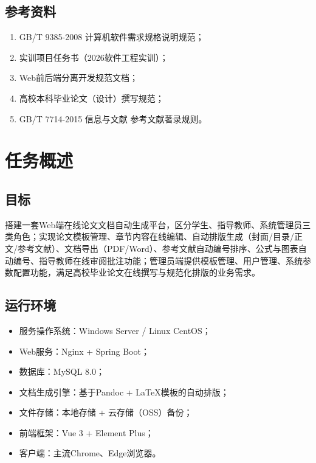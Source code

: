 \documentclass{../template/softeng}
\begin{document}
\subsection{参考资料}
\begin{enumerate}
    \item GB/T 9385-2008 计算机软件需求规格说明规范；
    \item 实训项目任务书（2026软件工程实训）；
    \item Web前后端分离开发规范文档；
    \item 高校本科毕业论文（设计）撰写规范；
    \item GB/T 7714-2015 信息与文献 参考文献著录规则。
\end{enumerate}

\section{任务概述}
\subsection{目标}
搭建一套Web端在线论文文档自动生成平台，区分学生、指导教师、系统管理员三类角色；实现论文模板管理、章节内容在线编辑、自动排版生成（封面/目录/正文/参考文献）、文档导出（PDF/Word）、参考文献自动编号排序、公式与图表自动编号、指导教师在线审阅批注功能；管理员端提供模板管理、用户管理、系统参数配置功能，满足高校毕业论文在线撰写与规范化排版的业务需求。

\subsection{运行环境}
\begin{itemize}
    \item 服务操作系统：Windows Server / Linux CentOS；
    \item Web服务：Nginx + Spring Boot；
    \item 数据库：MySQL 8.0；
    \item 文档生成引擎：基于Pandoc + LaTeX模板的自动排版；
    \item 文件存储：本地存储 + 云存储（OSS）备份；
    \item 前端框架：Vue 3 + Element Plus；
    \item 客户端：主流Chrome、Edge浏览器。
\end{itemize}
\end{document}
